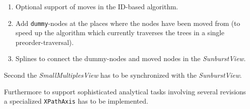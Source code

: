 \documentclass{llncs}
\begin{document}
\begin{enumerate}
\item Optional support of moves in the ID-based algorithm.
\item Add \texttt{dummy}-nodes at the places where the nodes have been moved from (to speed up the algorithm which currently traverses the trees in a single preorder-traversal).
\item Splines to connect the dummy-nodes and moved nodes in the \emph{SunburstView}.
\end{enumerate}

Second the \emph{SmallMultiplesView} has to be synchronized with the \emph{SunburstView}. 

Furthermore to support sophisticated analytical tasks involving several revisions a specialized \texttt{XPathAxis} has to be implemented.



\end{document}

